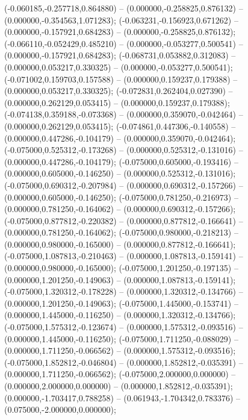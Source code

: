  (-0.060185,-0.257718,0.864880) -- (0.000000,-0.258825,0.876132) -- (0.000000,-0.354563,1.071283);
 (-0.063231,-0.156923,0.671262) -- (0.000000,-0.157921,0.684283) -- (0.000000,-0.258825,0.876132);
 (-0.066110,-0.052429,0.485210) -- (0.000000,-0.053277,0.500541) -- (0.000000,-0.157921,0.684283);
 (-0.068731,0.053882,0.312083) -- (0.000000,0.053217,0.330325) -- (0.000000,-0.053277,0.500541);
 (-0.071002,0.159703,0.157588) -- (0.000000,0.159237,0.179388) -- (0.000000,0.053217,0.330325);
 (-0.072831,0.262404,0.027390) -- (0.000000,0.262129,0.053415) -- (0.000000,0.159237,0.179388);
 (-0.074138,0.359188,-0.073368) -- (0.000000,0.359070,-0.042464) -- (0.000000,0.262129,0.053415);
 (-0.074861,0.447306,-0.140558) -- (0.000000,0.447286,-0.104179) -- (0.000000,0.359070,-0.042464);
 (-0.075000,0.525312,-0.173268) -- (0.000000,0.525312,-0.131016) -- (0.000000,0.447286,-0.104179);
 (-0.075000,0.605000,-0.193416) -- (0.000000,0.605000,-0.146250) -- (0.000000,0.525312,-0.131016);
 (-0.075000,0.690312,-0.207984) -- (0.000000,0.690312,-0.157266) -- (0.000000,0.605000,-0.146250);
 (-0.075000,0.781250,-0.216973) -- (0.000000,0.781250,-0.164062) -- (0.000000,0.690312,-0.157266);
 (-0.075000,0.877812,-0.220382) -- (0.000000,0.877812,-0.166641) -- (0.000000,0.781250,-0.164062);
 (-0.075000,0.980000,-0.218213) -- (0.000000,0.980000,-0.165000) -- (0.000000,0.877812,-0.166641);
 (-0.075000,1.087813,-0.210463) -- (0.000000,1.087813,-0.159141) -- (0.000000,0.980000,-0.165000);
 (-0.075000,1.201250,-0.197135) -- (0.000000,1.201250,-0.149063) -- (0.000000,1.087813,-0.159141);
 (-0.075000,1.320312,-0.178228) -- (0.000000,1.320312,-0.134766) -- (0.000000,1.201250,-0.149063);
 (-0.075000,1.445000,-0.153741) -- (0.000000,1.445000,-0.116250) -- (0.000000,1.320312,-0.134766);
 (-0.075000,1.575312,-0.123674) -- (0.000000,1.575312,-0.093516) -- (0.000000,1.445000,-0.116250);
 (-0.075000,1.711250,-0.088029) -- (0.000000,1.711250,-0.066562) -- (0.000000,1.575312,-0.093516);
 (-0.075000,1.852812,-0.046804) -- (0.000000,1.852812,-0.035391) -- (0.000000,1.711250,-0.066562);
 (-0.075000,2.000000,0.000000) -- (0.000000,2.000000,0.000000) -- (0.000000,1.852812,-0.035391);
 (0.000000,-1.703417,0.788258) -- (0.061943,-1.704342,0.783376) -- (0.075000,-2.000000,0.000000);
